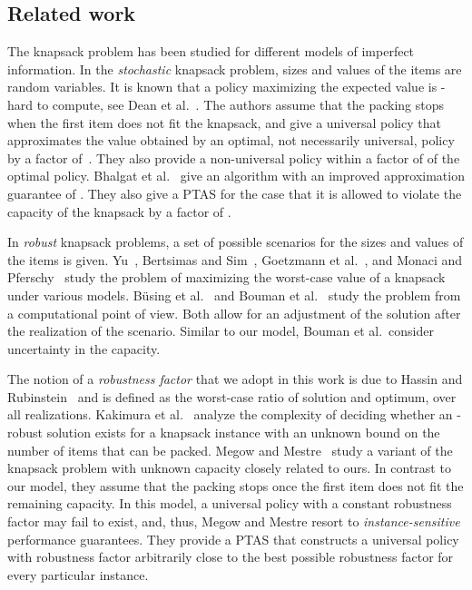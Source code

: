 \documentclass[11pt]{article}
\begin{document}
\subsection*{Related work}

The knapsack problem has been studied for different models of imperfect
information. In the \emph{stochastic} knapsack problem, sizes and
values of the items are random variables. It is known that a policy
maximizing the expected value is -hard to compute,
see Dean et al.~\cite{deanGV04}. The authors assume that the packing
stops when the first item does not fit the knapsack, and give a universal
policy that approximates the value obtained by an optimal, not necessarily
universal, policy by a factor of~. They also provide a non-universal
policy within a factor of  of the optimal policy. Bhalgat
et al.~\cite{bhalgatGK11} give an algorithm with an improved approximation
guarantee of . They also give a PTAS for the case that
it is allowed to violate the capacity of the knapsack by a factor
of .

In \emph{robust} knapsack problems, a set of possible scenarios for
the sizes and values of the items is given. Yu~\cite{yu96}, Bertsimas
and Sim~\cite{bertsimasS03}, Goetzmann et al.~\cite{GoetzmannST11},
and Monaci and Pferschy~\cite{monaciP11} study the problem of maximizing
the worst-case value of a knapsack under various models. Büsing et
al.~\cite{busingKK11-discrete} and Bouman et al.~\cite{boumanAH11}
study the problem from a computational point of view. Both allow for
an adjustment of the solution after the realization of the scenario.
Similar to our model, Bouman et al.~consider uncertainty in the capacity.

The notion of a \emph{robustness factor} that we adopt in this work
is due to Hassin and Rubinstein~\cite{hassinR02} and is defined
as the worst-case ratio of solution and optimum, over all realizations.
Kakimura et al.~\cite{kakimuraMS11} analyze the complexity of deciding
whether an -robust solution exists for a knapsack instance
with an unknown bound on the number of items that can be packed. Megow
and Mestre~\cite{megowM13} study a variant of the knapsack problem
with unknown capacity closely related to ours. In contrast to our
model, they assume that the packing stops once the first item does
not fit the remaining capacity. In this model, a universal policy
with a constant robustness factor may fail to exist, and, thus, Megow
and Mestre resort to \emph{instance-sensitive} performance guarantees.
They provide a PTAS that constructs a universal policy with robustness
factor arbitrarily close to the best possible robustness factor for
every particular instance.
\end{document}
